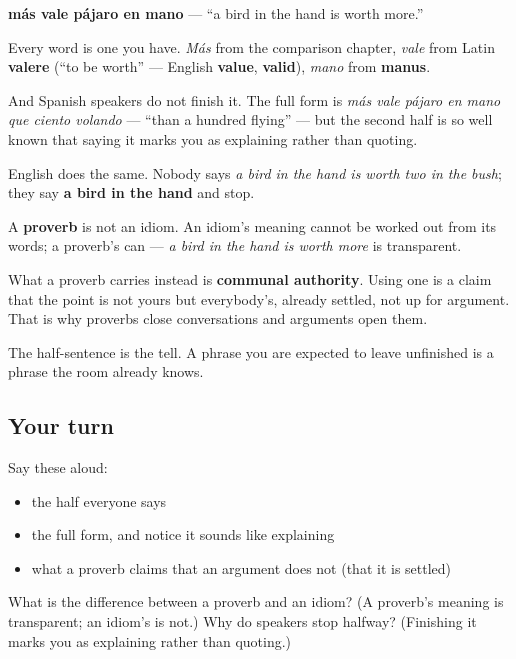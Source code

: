 \begin{cousinweb}
\textbf{más vale pájaro en mano} — \textquotedblleft{}a bird in the hand is worth more.\textquotedblright{}

Every word is one you have. \emph{Más} from the comparison chapter, \emph{vale} from Latin \textbf{valere} (\textquotedblleft{}to be worth\textquotedblright{} — English \textbf{value}, \textbf{valid}), \emph{mano} from \textbf{manus}.

And Spanish speakers do not finish it. The full form is \emph{más vale pájaro en mano que ciento volando} — \textquotedblleft{}than a hundred flying\textquotedblright{} — but the second half is so well known that saying it marks you as explaining rather than quoting.

English does the same. Nobody says \emph{a bird in the hand is worth two in the bush}; they say \textbf{a bird in the hand} and stop.
\end{cousinweb}

\begin{grammarlens}[title={What you've built}]
A \textbf{proverb} is not an idiom. An idiom's meaning cannot be worked out from its words; a proverb's can — \emph{a bird in the hand is worth more} is transparent.

What a proverb carries instead is \textbf{communal authority}. Using one is a claim that the point is not yours but everybody's, already settled, not up for argument. That is why proverbs close conversations and arguments open them.

The half-sentence is the tell. A phrase you are expected to leave unfinished is a phrase the room already knows.
\end{grammarlens}

\subsection*{Your turn}
Say these aloud:

\begin{itemize}
\raggedright
  \item the half everyone says
  \item the full form, and notice it sounds like explaining
  \item what a proverb claims that an argument does not (that it is settled)
\end{itemize}

\begin{tcolorbox}[breakable,colback=teal!4,colframe=teal!35!black,title={Before you move on}]
What is the difference between a proverb and an idiom? (A proverb's meaning is transparent; an idiom's is not.) Why do speakers stop halfway? (Finishing it marks you as explaining rather than quoting.)
\end{tcolorbox}
